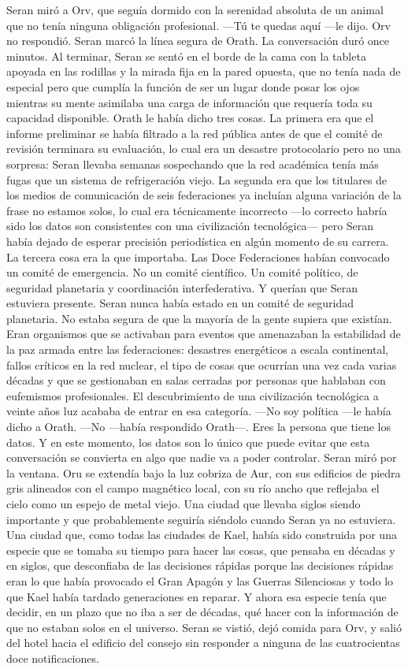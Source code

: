\documentclass[11pt,a5paper,twoside]{book}
\begin{document}
Seran miró a Orv, que seguía dormido con la serenidad absoluta de un animal que no tenía ninguna obligación profesional.
—Tú te quedas aquí —le dijo.
Orv no respondió. Seran marcó la línea segura de Orath.
La conversación duró once minutos. Al terminar, Seran se sentó en el borde de la cama con la tableta apoyada en las rodillas y la mirada fija en la pared opuesta, que no tenía nada de especial pero que cumplía la función de ser un lugar donde posar los ojos mientras su mente asimilaba una carga de información que requería toda su capacidad disponible.
Orath le había dicho tres cosas. La primera era que el informe preliminar se había filtrado a la red pública antes de que el comité de revisión terminara su evaluación, lo cual era un desastre protocolario pero no una sorpresa: Seran llevaba semanas sospechando que la red académica tenía más fugas que un sistema de refrigeración viejo. La segunda era que los titulares de los medios de comunicación de seis federaciones ya incluían alguna variación de la frase no estamos solos, lo cual era técnicamente incorrecto —lo correcto habría sido los datos son consistentes con una civilización tecnológica— pero Seran había dejado de esperar precisión periodística en algún momento de su carrera.
La tercera cosa era la que importaba.
Las Doce Federaciones habían convocado un comité de emergencia. No un comité científico. Un comité político, de seguridad planetaria y coordinación interfederativa. Y querían que Seran estuviera presente.
Seran nunca había estado en un comité de seguridad planetaria. No estaba segura de que la mayoría de la gente supiera que existían. Eran organismos que se activaban para eventos que amenazaban la estabilidad de la paz armada entre las federaciones: desastres energéticos a escala continental, fallos críticos en la red nuclear, el tipo de cosas que ocurrían una vez cada varias décadas y que se gestionaban en salas cerradas por personas que hablaban con eufemismos profesionales.
El descubrimiento de una civilización tecnológica a veinte años luz acababa de entrar en esa categoría.
—No soy política —le había dicho a Orath.
—No —había respondido Orath—. Eres la persona que tiene los datos. Y en este momento, los datos son lo único que puede evitar que esta conversación se convierta en algo que nadie va a poder controlar.
Seran miró por la ventana. Oru se extendía bajo la luz cobriza de Aur, con sus edificios de piedra gris alineados con el campo magnético local, con su río ancho que reflejaba el cielo como un espejo de metal viejo. Una ciudad que llevaba siglos siendo importante y que probablemente seguiría siéndolo cuando Seran ya no estuviera. Una ciudad que, como todas las ciudades de Kael, había sido construida por una especie que se tomaba su tiempo para hacer las cosas, que pensaba en décadas y en siglos, que desconfiaba de las decisiones rápidas porque las decisiones rápidas eran lo que había provocado el Gran Apagón y las Guerras Silenciosas y todo lo que Kael había tardado generaciones en reparar.
Y ahora esa especie tenía que decidir, en un plazo que no iba a ser de décadas, qué hacer con la información de que no estaban solos en el universo.
Seran se vistió, dejó comida para Orv, y salió del hotel hacia el edificio del consejo sin responder a ninguna de las cuatrocientas doce notificaciones.
\end{document}
